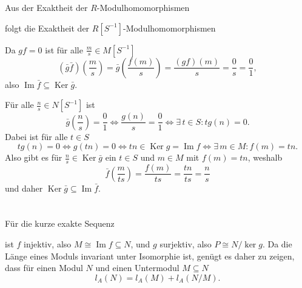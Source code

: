 \documentclass[a4paper,10pt]{article}
\theoremstyle{definition}
\newcommand{\Img}{\operatorname{Im}}
\newcommand{\Ker}{\operatorname{Ker}}
\begin{document}
Aus der Exaktheit der $R$-Modulhomomorphismen
\begin{center}
\end{center}
folgt die Exaktheit der $R[S^{-1}]$-Modulhomomorphismen
\begin{center}
\end{center}

Da $gf = 0$ ist für alle $\frac{m}{s} \in M[S^{-1}]$
\[
 (\bar{g} \bar{f})\left( \frac{m}{s} \right)
 = \bar{g}\left( \frac{f(m)}{s} \right)
 = \frac{(gf)(m)}{s}
 = \frac{0}{s}
 = \frac{0}{1},
\]
also $\Img \bar{f} \subseteq \Ker \bar{g}$.

Für alle $\frac{n}{s} \in N[S^{-1}]$ ist
\[
 \bar{g}\left(\frac{n}{s}\right) = \frac{0}{1}
 \Leftrightarrow \frac{g(n)}{s} = \frac{0}{1}
 \Leftrightarrow \exists\, t \in S : tg(n) = 0.
\]
Dabei ist für alle $t \in S$
\[
 tg(n) = 0 
 \Leftrightarrow g(tn) = 0
 \Leftrightarrow tn \in \Ker g = \Img f
 \Leftrightarrow \exists\, m \in M : f(m) = tn.
\]
Also gibt es für $\frac{n}{s} \in \Ker \bar{g}$ ein $t \in S$ und $m \in M$ mit $f(m) = tn$, weshalb
\[
 \bar{f}\left( \frac{m}{ts} \right)
 = \frac{f(m)}{ts}
 = \frac{tn}{ts}
 = \frac{n}{s}
\]
und daher $\Ker \bar{g} \subseteq \Img \bar{f}$.





\section{}
Für die kurze exakte Sequenz
\begin{center}
\end{center}
ist $f$ injektiv, also $M \cong \Img f \subseteq N$, und $g$ surjektiv, also $P \cong N / \ker g$. Da die Länge eines Moduls invariant unter Isomorphie ist, genügt es daher zu zeigen, dass für einen Modul $N$ und einen Untermodul $M \subseteq N$
\[
 l_A(N) = l_A(M) + l_A(N/M).
\]
\end{document}
